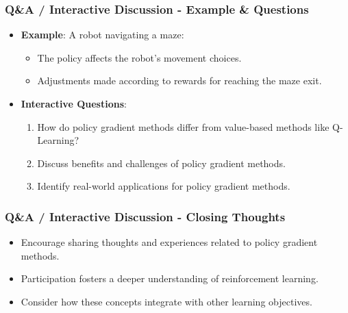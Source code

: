 \documentclass[aspectratio=169]{beamer}
\begin{document}
\begin{frame}[fragile]
    \frametitle{Q\&A / Interactive Discussion - Example & Questions}
    \begin{itemize}
        \item \textbf{Example}: A robot navigating a maze:
        \begin{itemize}
            \item The policy affects the robot's movement choices.
            \item Adjustments made according to rewards for reaching the maze exit.
        \end{itemize}
        \item \textbf{Interactive Questions}:
        \begin{enumerate}
            \item How do policy gradient methods differ from value-based methods like Q-Learning?
            \item Discuss benefits and challenges of policy gradient methods.
            \item Identify real-world applications for policy gradient methods.
        \end{enumerate}
    \end{itemize}
\end{frame}

\begin{frame}[fragile]
    \frametitle{Q\&A / Interactive Discussion - Closing Thoughts}
    \begin{itemize}
        \item Encourage sharing thoughts and experiences related to policy gradient methods.
        \item Participation fosters a deeper understanding of reinforcement learning.
        \item Consider how these concepts integrate with other learning objectives.
    \end{itemize}
\end{frame}
\end{document}
